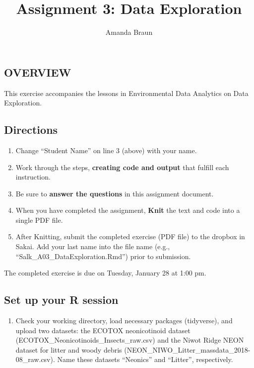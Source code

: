 \documentclass[]{article}
\title{Assignment 3: Data Exploration}
\author{Amanda Braun}
\date{}
\providecommand{\tightlist}{%
  \setlength{\itemsep}{0pt}\setlength{\parskip}{0pt}}
\begin{document}
\maketitle

\hypertarget{overview}{%
\subsection{OVERVIEW}\label{overview}}

This exercise accompanies the lessons in Environmental Data Analytics on
Data Exploration.

\hypertarget{directions}{%
\subsection{Directions}\label{directions}}

\begin{enumerate}
\def\labelenumi{\arabic{enumi}.}
\tightlist
\item
  Change ``Student Name'' on line 3 (above) with your name.
\item
  Work through the steps, \textbf{creating code and output} that fulfill
  each instruction.
\item
  Be sure to \textbf{answer the questions} in this assignment document.
\item
  When you have completed the assignment, \textbf{Knit} the text and
  code into a single PDF file.
\item
  After Knitting, submit the completed exercise (PDF file) to the
  dropbox in Sakai. Add your last name into the file name (e.g.,
  ``Salk\_A03\_DataExploration.Rmd'') prior to submission.
\end{enumerate}

The completed exercise is due on Tuesday, January 28 at 1:00 pm.

\hypertarget{set-up-your-r-session}{%
\subsection{Set up your R session}\label{set-up-your-r-session}}

\begin{enumerate}
\def\labelenumi{\arabic{enumi}.}
\tightlist
\item
  Check your working directory, load necessary packages (tidyverse), and
  upload two datasets: the ECOTOX neonicotinoid dataset
  (ECOTOX\_Neonicotinoids\_Insects\_raw.csv) and the Niwot Ridge NEON
  dataset for litter and woody debris
  (NEON\_NIWO\_Litter\_massdata\_2018-08\_raw.csv). Name these datasets
  ``Neonics'' and ``Litter'', respectively.
\end{enumerate}
\end{document}
